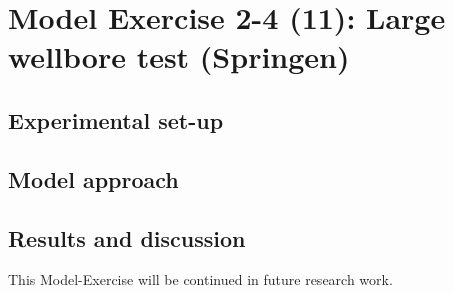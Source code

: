 \section{Model Exercise 2-4 (11): Large wellbore test (Springen)}
\label{sec:mex11}
\subsection{Experimental set-up}
\subsection{Model approach}
\subsection{Results and discussion}
This Model-Exercise will be continued in future research work.
